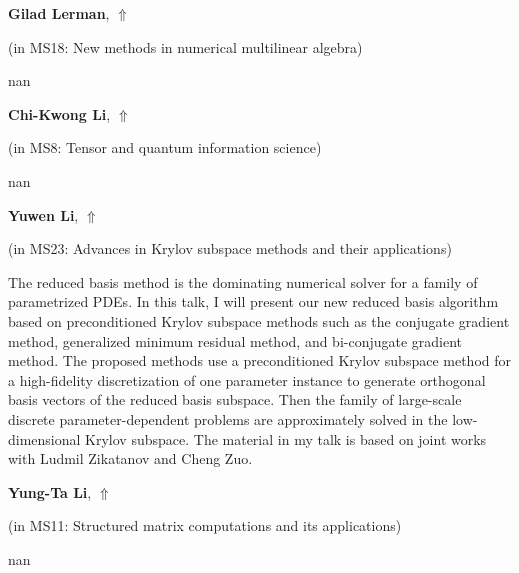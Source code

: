 \documentclass[ILAS2025-program.tex]{subfiles}
\begin{document}
     \hypertarget{down0147}{}\begin{ilasabstract}
    
    \textbf{Gilad Lerman},  \hfill \hyperlink{up0147}{$\Uparrow$}
    
    (in {\color{mstitle}MS18: New methods in numerical multilinear algebra})
        
        \mtskip
    nan\end{ilasabstract}
     \hypertarget{down0054}{}\begin{ilasabstract}
    
    \textbf{Chi-Kwong Li},  \hfill \hyperlink{up0054}{$\Uparrow$}
    
    (in {\color{mstitle}MS8: Tensor and quantum information science})
        
        \mtskip
    nan\end{ilasabstract}
     \hypertarget{down0195}{}\begin{ilasabstract}
    
    \textbf{Yuwen Li},  \hfill \hyperlink{up0195}{$\Uparrow$}
    
    (in {\color{mstitle}MS23: Advances in Krylov subspace methods and their applications})
        
        \mtskip
    The reduced basis method is the dominating numerical solver for a family of parametrized PDEs. In this talk, I will present our new reduced basis algorithm based on preconditioned Krylov subspace methods such as the conjugate gradient method, generalized minimum residual method, and bi-conjugate gradient method. The proposed methods use a preconditioned Krylov subspace method for a high-fidelity discretization of one parameter instance to generate orthogonal basis vectors of the reduced basis subspace. Then the family of large-scale discrete parameter-dependent problems are approximately solved in the low-dimensional Krylov subspace. The material in my talk is based on joint works with Ludmil Zikatanov and Cheng Zuo.
\end{ilasabstract}
     \hypertarget{down0236}{}\begin{ilasabstract}
    
    \textbf{Yung-Ta Li},  \hfill \hyperlink{up0236}{$\Uparrow$}
    
    (in {\color{mstitle}MS11: Structured matrix computations and its applications})
        
        \mtskip
    nan\end{ilasabstract}
\end{document}

